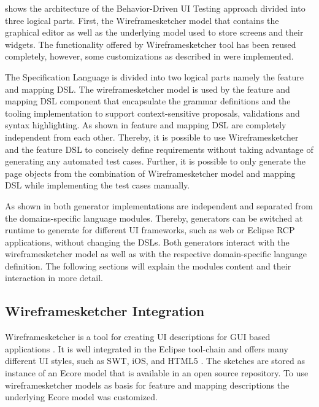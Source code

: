 \documentclass{sig-alternate-05-2015}
\begin{document}
 shows the architecture of the Behavior-Driven UI Testing approach divided into three logical parts. 
First, the Wireframesketcher model that contains the graphical editor as well as the underlying model used to store screens and their widgets.
The functionality offered by Wireframesketcher tool has been reused completely, however, some customizations as described in  were implemented.

The Specification Language is divided into two logical parts namely the feature and mapping DSL.
The wireframesketcher model is used by the feature and mapping DSL component that encapsulate the grammar definitions and the tooling implementation to support context-sensitive proposals, validations and syntax highlighting.
As shown in  feature and mapping DSL are completely independent from each other.
Thereby, it is possible to use Wireframesketcher and the feature DSL to concisely define requirements without taking advantage of generating any automated test cases.
Further, it is possible to only generate the page objects from the combination of Wireframesketcher model and mapping DSL while implementing the test cases manually.

As shown in  both generator implementations are independent and separated from the domains-specific language modules.
Thereby, generators can be switched at runtime to generate for different UI frameworks, such as web or Eclipse RCP applications, without changing the DSLs.
Both generators interact with the wireframesketcher model as well as with the respective domain-specific language definition.
The following sections will explain the modules content and their interaction in more detail.

\subsection{Wireframesketcher Integration}\label{sec:WireframesketcherIntegration} 
Wireframesketcher is a tool for creating UI descriptions for GUI based applications \cite{sanchezgui}. 
It is well integrated in the Eclipse tool-chain and offers many different UI styles, such as SWT, iOS, and HTML5  \cite{Wireframesketcher}.
The sketches are stored as instance of an Ecore model that is available in an open source repository.
To use wireframesketcher models as basis for feature and mapping descriptions the underlying Ecore model was customized.
\end{document}
